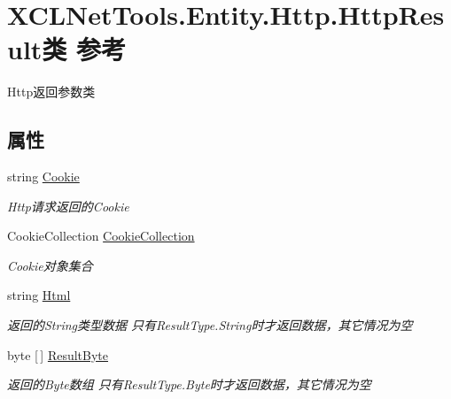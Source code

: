 \hypertarget{class_x_c_l_net_tools_1_1_entity_1_1_http_1_1_http_result}{}\section{X\+C\+L\+Net\+Tools.\+Entity.\+Http.\+Http\+Result类 参考}
\label{class_x_c_l_net_tools_1_1_entity_1_1_http_1_1_http_result}


Http返回参数类  


\subsection*{属性}
\begin{DoxyCompactItemize}
\item 
string \hyperlink{class_x_c_l_net_tools_1_1_entity_1_1_http_1_1_http_result_a08219bb78cf5eb91045b344c91e72fad}{Cookie}
\begin{DoxyCompactList}\small\item\em Http请求返回的\+Cookie \end{DoxyCompactList}\item 
Cookie\+Collection \hyperlink{class_x_c_l_net_tools_1_1_entity_1_1_http_1_1_http_result_a30f5eb22081db0c17f2924ac0ee89156}{Cookie\+Collection}
\begin{DoxyCompactList}\small\item\em Cookie对象集合 \end{DoxyCompactList}\item 
string \hyperlink{class_x_c_l_net_tools_1_1_entity_1_1_http_1_1_http_result_a9fc43bbbeb2f24faeeab16785cd7c402}{Html}
\begin{DoxyCompactList}\small\item\em 返回的\+String类型数据 只有\+Result\+Type.\+String时才返回数据，其它情况为空 \end{DoxyCompactList}\item 
byte \mbox{[}$\,$\mbox{]} \hyperlink{class_x_c_l_net_tools_1_1_entity_1_1_http_1_1_http_result_aced655e4fc880e3123a3eb5c899a0085}{Result\+Byte}
\begin{DoxyCompactList}\small\item\em 返回的\+Byte数组 只有\+Result\+Type.\+Byte时才返回数据，其它情况为空 \end{DoxyCompactList}\item 

\end{DoxyCompactItemize}
